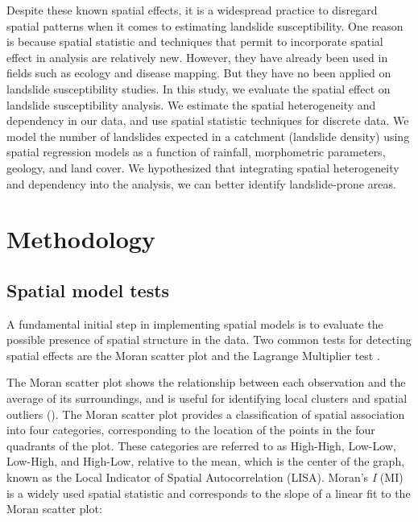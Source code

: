 \documentclass[
  manuscript=article,  
  layout=preprint,  
  year=2023,
  volume=0,
]{format}
\begin{document}
\par Despite these known spatial effects, it is a widespread practice to disregard spatial patterns when it comes to estimating landslide susceptibility. One reason is because spatial statistic and techniques that permit to incorporate spatial effect in analysis are relatively new. However, they have already been used in fields such as ecology and disease mapping. But they have no been applied on landslide susceptibility studies. In this study, we evaluate the spatial effect on landslide susceptibility analysis. We estimate the spatial heterogeneity and dependency in our data, and use spatial statistic techniques for discrete data. We model the number of landslides expected in a catchment (landslide density) using spatial regression models as a function of rainfall, morphometric parameters, geology, and land cover. We hypothesized that integrating spatial heterogeneity and dependency into the analysis, we can better identify landslide-prone areas.

\section{Methodology}

\subsection{Spatial model tests}
\par A fundamental initial step in implementing spatial models is to evaluate the possible presence of spatial structure in the data. Two common tests for detecting spatial effects are the Moran scatter plot and the Lagrange Multiplier test \cite{anselin1996simple}.

\par The Moran scatter plot shows the relationship between each observation and the average of its surroundings, and is useful for identifying local clusters and spatial outliers (\cite{anselin1988spatial}). The Moran scatter plot provides a classification of spatial association into four categories, corresponding to the location of the points in the four quadrants of the plot. These categories are referred to as High-High, Low-Low, Low-High, and High-Low, relative to the mean, which is the center of the graph, known as the Local Indicator of Spatial Autocorrelation (LISA). Moran's \textit{I} (MI) is a widely used spatial statistic and corresponds to the slope of a linear fit to the Moran scatter plot:
\end{document}
